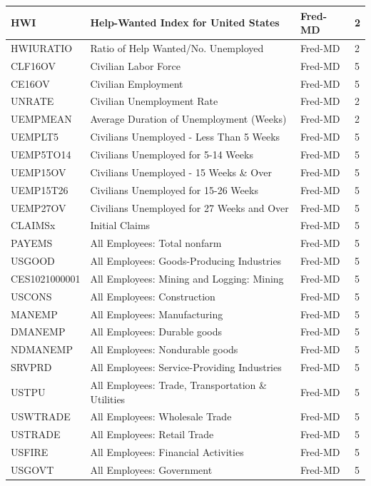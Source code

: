 \documentclass[11pt]{article}
\theoremstyle{plain}
\theoremstyle{definition}
\theoremstyle{remark}
\numberwithin{equation}{section}
\begin{document}
{\begin{longtable}{|l|l|l|l|}
HWI & Help-Wanted Index for United States & Fred-MD & 2 \\ \hline
HWIURATIO & Ratio of Help Wanted/No. Unemployed & Fred-MD & 2 \\ \hline
CLF16OV & Civilian Labor Force & Fred-MD & 5 \\ \hline
CE16OV & Civilian Employment & Fred-MD & 5 \\ \hline
UNRATE & Civilian Unemployment Rate & Fred-MD & 2 \\ \hline
UEMPMEAN & Average Duration of Unemployment (Weeks) & Fred-MD & 2 \\ \hline
UEMPLT5 & Civilians Unemployed - Less Than 5 Weeks & Fred-MD & 5 \\ \hline
UEMP5TO14 & Civilians Unemployed for 5-14 Weeks & Fred-MD & 5 \\ \hline
UEMP15OV & Civilians Unemployed - 15 Weeks \& Over & Fred-MD & 5 \\ \hline
UEMP15T26 & Civilians Unemployed for 15-26 Weeks & Fred-MD & 5 \\ \hline
UEMP27OV & Civilians Unemployed for 27 Weeks and Over & Fred-MD & 5 \\ \hline
CLAIMSx & Initial Claims & Fred-MD & 5 \\ \hline
PAYEMS & All Employees: Total nonfarm & Fred-MD & 5 \\ \hline
USGOOD & All Employees: Goods-Producing Industries & Fred-MD & 5 \\ \hline
CES1021000001 & All Employees: Mining and Logging: Mining & Fred-MD & 5 \\ \hline
USCONS & All Employees: Construction & Fred-MD & 5 \\ \hline
MANEMP & All Employees: Manufacturing & Fred-MD & 5 \\ \hline
DMANEMP & All Employees: Durable goods & Fred-MD & 5 \\ \hline
NDMANEMP & All Employees: Nondurable goods & Fred-MD & 5 \\ \hline
SRVPRD & All Employees: Service-Providing Industries & Fred-MD & 5 \\ \hline
USTPU & All Employees: Trade, Transportation \& Utilities & Fred-MD & 5 \\ \hline
USWTRADE & All Employees: Wholesale Trade & Fred-MD & 5 \\ \hline
USTRADE & All Employees: Retail Trade & Fred-MD & 5 \\ \hline
USFIRE & All Employees: Financial Activities & Fred-MD & 5 \\ \hline
USGOVT & All Employees: Government & Fred-MD & 5 \\ \hline

\end{longtable}}
\end{document}
